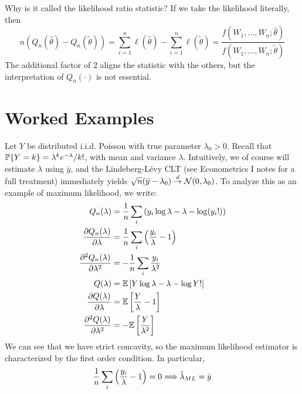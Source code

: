 \documentclass[10pt]{article}
\begin{document}
\begin{remark}
	Why is it called the likelihood ratio statistic? If we take the likelihood literally, then
	\[
	n (Q_n(\hat{\theta}) - Q_n(\tilde{\theta})) = \sum_{i=1}^n \ell(\hat{\theta}) - \sum_{i=1}^n \ell(\tilde{\theta})  = \frac{f(W_1,\dots,W_n;\hat{\theta})}{f(W_1,\dots,W_n;\tilde{\theta})}
	\]
	The additional factor of 2 aligns the statistic with the others, but the interpretation of $Q_n(\cdot)$ is not essential.
\end{remark}

\section{Worked Examples}

\begin{example}
	Let $Y$ be distributed i.i.d. Poisson with true parameter $\lambda_0 > 0$. Recall that $\mathbb{P}\{Y = k\} = \lambda^k e^{-\lambda} / k!$, with mean and variance $\lambda$. Intuitively, we of course will estimate $\lambda$ using $\bar{y}$, and the Lindeberg-L\'{e}vy CLT (see Econometrics I notes for a full treatment) immediately yields $\sqrt{n}(\bar{y}-\lambda_0 ) \overset{d}{\to} \mathcal{N}(0,\lambda_0)$. To analyze this as an example of maximum likelihood, we write:
	\begin{align*}
		Q_n(\lambda) &= \frac{1}{n} \sum_i \left( y_i \log \lambda - \lambda - \log(y_i!)\right) \\
		\frac{\partial Q_n(\lambda)}{\partial \lambda} &= \frac{1}{n}\sum_i \left( \frac{y_i}{\lambda}-1\right) \\
		\frac{\partial^2 Q_n(\lambda)}{\partial \lambda^2} &= -\frac{1}{n}\sum_i \frac{y_i}{\lambda^2} \\
		Q(\lambda) &= \mathbb{E}\left[ Y \log \lambda - \lambda - \log Y!\right]  \\
		\frac{\partial Q(\lambda)}{\partial \lambda} &= \mathbb{E} \left[ \frac{Y}{\lambda} - 1\right] \\
		\frac{\partial^2Q(\lambda)}{\partial \lambda^2} &= - \mathbb{E} \left[ \frac{Y}{\lambda^2}\right]
	\end{align*}
	We can see that we have strict concavity, so the maximum likelihood estimator is characterized by the first order condition. In particular, 
	\[
	\frac{1}{n}\sum_i \left( \frac{y_i}{\lambda} - 1\right) = 0 \Longrightarrow \hat{\lambda}_{ML} = \bar{y}
	\]

\end{example}
\end{document}
